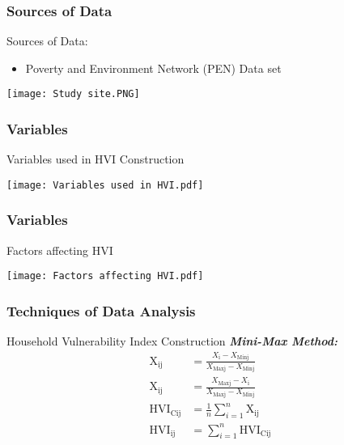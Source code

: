 \documentclass{beamer}
\begin{document}
	\begin{frame}
		\frametitle{Sources of Data}
		\begin{exampleblock}{Sources of Data:}
			\begin{itemize}
				\item Poverty and Environment Network (PEN) Data set 
			\end{itemize}
		\end{exampleblock}
		\begin{center}
			\texttt{[image: Study site.PNG]}
		\end{center}
	\end{frame}
	\begin{frame}
		\frametitle{Variables}
		\begin{exampleblock}{Variables used in HVI Construction}
		\end{exampleblock}
		\begin{center}
			\texttt{[image: Variables used in HVI.pdf]}
		\end{center}
	\end{frame}
	
	\begin{frame}
		\frametitle{Variables}
		\begin{exampleblock}{Factors affecting HVI}
		\end{exampleblock}
		\vspace{-65pt}
		\begin{center}
			\texttt{[image: Factors affecting HVI.pdf]}
		\end{center}
	\end{frame}
	
	\begin{frame}
		\frametitle{Techniques of Data Analysis}
		\begin{block}{Household Vulnerability Index Construction}
			\textbf{\textit{Mini-Max Method:}}
			\begin{align}
				\text{X}_{\text{ij}} &= \frac{X_{\text{i}} - X_{\text{Minj}}}{X_{\text{Maxj}} - X_{\text{Minj}}} \tag{1} \\[0.5cm] 	
				\text{X}_{\text{ij}} &= \frac{X_{\text{Maxj}} - X_{\text{i}}}{X_{\text{Maxj}} - X_{\text{Minj}}} \tag{2}\\[0.5cm]
				\text{HVI}_{\text{Cij}} &= \frac{1}{n}\sum_{i=1}^{n}\text{X}_{\text{ij}} \tag{3}\\[0.5cm]
				\text{HVI}_{\text{ij}} &= \sum_{i=1}^{n}\text{HVI}_{\text{Cij}} \tag{4}
			\end{align} 
		\end{block}
	\end{frame}
	
\end{document}
